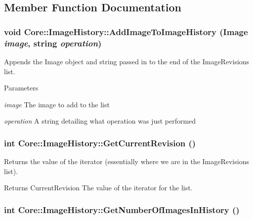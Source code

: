 \subsection{Member Function Documentation}
\hypertarget{class_core_1_1_image_history_a6631d7fefea3a1a28fc6dcdf887daf37}{
\subsubsection[{AddImageToImageHistory}]{\setlength{\rightskip}{0pt plus 5cm}void Core::ImageHistory::AddImageToImageHistory (Image {\em image}, \/  string {\em operation})}}
\label{class_core_1_1_image_history_a6631d7fefea3a1a28fc6dcdf887daf37}
Appends the Image object and string passed in to the end of the ImageRevisions list. 
\begin{DoxyParams}{Parameters}
\item[{\em image}]The image to add to the list \item[{\em operation}]A string detailing what operation was just performed \end{DoxyParams}
\hypertarget{class_core_1_1_image_history_a421e672ff9f20e10a03bf989cff4442e}{
\subsubsection[{GetCurrentRevision}]{\setlength{\rightskip}{0pt plus 5cm}int Core::ImageHistory::GetCurrentRevision ()}}
\label{class_core_1_1_image_history_a421e672ff9f20e10a03bf989cff4442e}
Returns the value of the iterator (essentially where we are in the ImageRevisions list). \begin{DoxyReturn}{Returns}
CurrentRevision The value of the iterator for the list. 
\end{DoxyReturn}
\hypertarget{class_core_1_1_image_history_ae26bcfeed34a733dd372896a86bbc3d4}{
\subsubsection[{GetNumberOfImagesInHistory}]{\setlength{\rightskip}{0pt plus 5cm}int Core::ImageHistory::GetNumberOfImagesInHistory ()}}
